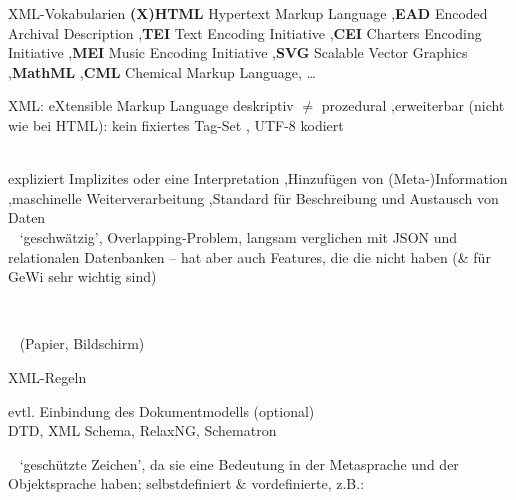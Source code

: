 \begin{frame}[allowframebreaks]{XML-Vokabularien}
\footnotesize
\textbf{(X)HTML} Hypertext Markup Language \sep \textbf{EAD} Encoded Archival Description \sep \textbf{TEI} Text Encoding Initiative \sep \textbf{CEI} Charters Encoding Initiative \sep \textbf{MEI} Music Encoding Initiative \sep \textbf{SVG} Scalable Vector Graphics \sep \textbf{MathML} \sep \textbf{CML} Chemical Markup Language, \dots
\end{frame}

\begin{frame}[allowframebreaks]{XML: eXtensible Markup Language}
\footnotesize
deskriptiv $\neq$ prozedural \sep erweiterbar (nicht wie bei HTML): kein fixiertes Tag-Set \sep 
UTF-8 kodiert

~\\

expliziert Implizites oder eine Interpretation \sep Hinzufügen von (Meta-)Information \sep maschinelle Weiterverarbeitung 
\sep Standard für Beschreibung und Austausch von Daten ~\\


~  `geschwätzig', Overlapping-Problem, langsam verglichen mit JSON und relationalen Datenbanken -- hat aber auch Features, die die nicht haben (\& für GeWi sehr wichtig sind)

~ 

~ (Papier, Bildschirm)

\end{frame}



\begin{frame}{XML-Regeln}
\footnotesize
{}~ \\

evtl. Einbindung des Dokumentmodells (optional) \\
DTD, XML Schema, RelaxNG, Schematron \\
\smallskip

~ `geschützte Zeichen', da sie eine Bedeutung in der Metasprache und der Objektsprache haben; selbstdefiniert \& vordefinierte, z.B.: \\
\end{frame}

